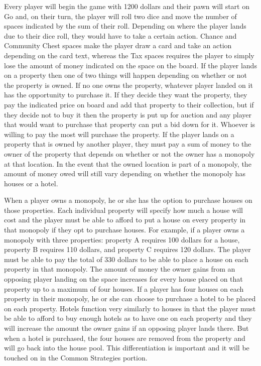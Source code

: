 \documentclass{article}
\begin{document}
Every player will begin the game with 1200 dollars and their pawn will start on Go and, on their turn, the player will roll two dice and move the number of spaces indicated by the sum of their roll.  Depending on where the player lands due to their dice roll, they would have to take a certain action.  Chance and Community Chest spaces make the player draw a card and take an action depending on the card text, whereas the Tax spaces requires the player to simply lose the amount of money indicated on the space on the board.  If the player lands on a property then one of two things will happen depending on whether or not the property is owned.  If no one owns the property, whatever player landed on it has the opportunity to purchase it.  If they decide they want the property, they pay the indicated price on board and add that property to their collection, but if they decide not to buy it then the property is put up for auction and any player that would want to purchase that property can put a bid down for it.  Whoever is willing to pay the most will purchase the property.  If the player lands on a property that is owned by another player, they must pay a sum of money to the owner of the property that depends on whether or not the owner has a monopoly at that location.  In the event that the owned location is part of a monopoly, the amount of money owed will still vary depending on whether the monopoly has houses or a hotel.

When a player owns a monopoly, he or she has the option to purchase houses on those properties.  Each individual property will specify how much a house will cost and the player must be able to afford to put a house on every property in that monopoly if they opt to purchase houses.  For example, if a player owns a monopoly with three properties: property A requires 100 dollars for a house, property B requires 110 dollars, and property C requires 120 dollars.  The player must be able to pay the total of 330 dollars to be able to place a house on each property in that monopoly.  The amount of money the owner gains from an opposing player landing on the space increases for every house placed on that property up to a maximum of four houses.  If a player has four houses on each property in their monopoly, he or she can choose to purchase a hotel to be placed on each property.  Hotels function very similarly to houses in that the player must be able to afford to buy enough hotels as to have one on each property and they will increase the amount the owner gains if an opposing player lands there. But when a hotel is purchased, the four houses are removed from the property and will go back into the house pool.  This differentiation is important and it will be touched on in the Common Strategies portion.
\end{document}
